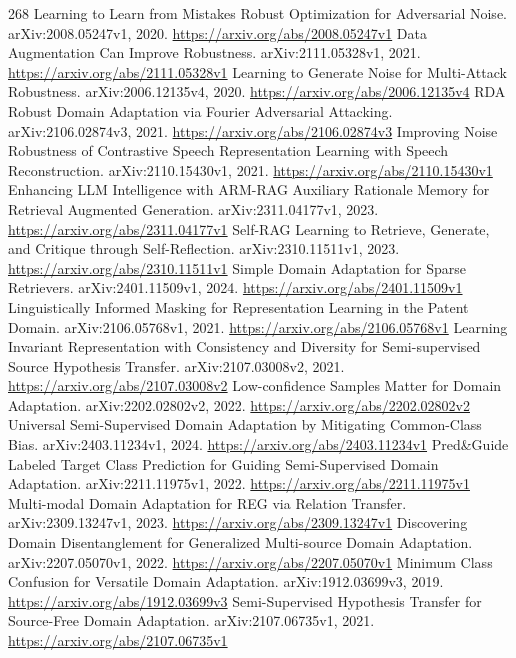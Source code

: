 \documentclass[11pt]{article}
\begin{document}
\begin{thebibliography}{268}
 Learning to Learn from Mistakes Robust Optimization for Adversarial Noise. arXiv:2008.05247v1, 2020. \url{https://arxiv.org/abs/2008.05247v1}
 Data Augmentation Can Improve Robustness. arXiv:2111.05328v1, 2021. \url{https://arxiv.org/abs/2111.05328v1}
 Learning to Generate Noise for Multi-Attack Robustness. arXiv:2006.12135v4, 2020. \url{https://arxiv.org/abs/2006.12135v4}
 RDA Robust Domain Adaptation via Fourier Adversarial Attacking. arXiv:2106.02874v3, 2021. \url{https://arxiv.org/abs/2106.02874v3}
 Improving Noise Robustness of Contrastive Speech Representation Learning with Speech Reconstruction. arXiv:2110.15430v1, 2021. \url{https://arxiv.org/abs/2110.15430v1}
 Enhancing LLM Intelligence with ARM-RAG Auxiliary Rationale Memory for Retrieval Augmented Generation. arXiv:2311.04177v1, 2023. \url{https://arxiv.org/abs/2311.04177v1}
 Self-RAG Learning to Retrieve, Generate, and Critique through Self-Reflection. arXiv:2310.11511v1, 2023. \url{https://arxiv.org/abs/2310.11511v1}
 Simple Domain Adaptation for Sparse Retrievers. arXiv:2401.11509v1, 2024. \url{https://arxiv.org/abs/2401.11509v1}
 Linguistically Informed Masking for Representation Learning in the Patent Domain. arXiv:2106.05768v1, 2021. \url{https://arxiv.org/abs/2106.05768v1}
 Learning Invariant Representation with Consistency and Diversity for Semi-supervised Source Hypothesis Transfer. arXiv:2107.03008v2, 2021. \url{https://arxiv.org/abs/2107.03008v2}
 Low-confidence Samples Matter for Domain Adaptation. arXiv:2202.02802v2, 2022. \url{https://arxiv.org/abs/2202.02802v2}
 Universal Semi-Supervised Domain Adaptation by Mitigating Common-Class Bias. arXiv:2403.11234v1, 2024. \url{https://arxiv.org/abs/2403.11234v1}
 Pred\&Guide Labeled Target Class Prediction for Guiding Semi-Supervised Domain Adaptation. arXiv:2211.11975v1, 2022. \url{https://arxiv.org/abs/2211.11975v1}
 Multi-modal Domain Adaptation for REG via Relation Transfer. arXiv:2309.13247v1, 2023. \url{https://arxiv.org/abs/2309.13247v1}
 Discovering Domain Disentanglement for Generalized Multi-source Domain Adaptation. arXiv:2207.05070v1, 2022. \url{https://arxiv.org/abs/2207.05070v1}
 Minimum Class Confusion for Versatile Domain Adaptation. arXiv:1912.03699v3, 2019. \url{https://arxiv.org/abs/1912.03699v3}
 Semi-Supervised Hypothesis Transfer for Source-Free Domain Adaptation. arXiv:2107.06735v1, 2021. \url{https://arxiv.org/abs/2107.06735v1}

\end{thebibliography}
\end{document}
